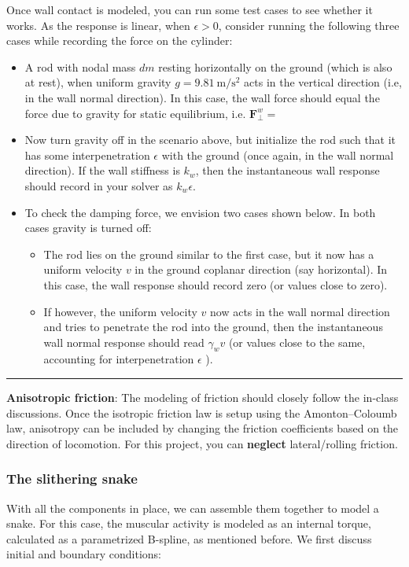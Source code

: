 \documentclass[11pt]{article}
\begin{document}
Once wall contact is modeled, you can run some test cases to see
whether it works. As the response is linear, when \(\epsilon > 0\),
consider running the following three cases while recording the force on the
cylinder:
\begin{itemize}
\item A rod with nodal mass \(dm\) resting horizontally on the ground (which
is also at rest), when
uniform gravity \(g = \SI{9.81}{\m\per\s^2}\) acts in the vertical
direction (i.e, in the wall normal direction). In
this case, the wall force should equal the force due to gravity for static
equilibrium, i.e. \(\mathbf{F}^w_{\perp}=\)
\item Now turn gravity off in the scenario above, but initialize the rod such
that it has some interpenetration \(\epsilon\) with the ground (once
again, in the wall normal direction). If the
wall stiffness is \(k_w\), then the instantaneous wall response should
record in your solver as \(k_w \epsilon\).
\item To check the damping force, we envision two cases shown below. In both
cases gravity is turned off:
\begin{itemize}
\item The rod lies on the ground similar to the first case, but it now has a
uniform velocity \(v\) in the ground coplanar direction (say
horizontal). In this case, the wall response should record zero (or
values close to zero).
\item If however, the uniform velocity \(v\) now acts in the wall normal
direction and tries to penetrate the rod into the ground, then the
instantaneous wall normal response should read \(\gamma_w v\) (or
values close to the same, accounting for interpenetration \(\epsilon\) ).
\end{itemize}
\end{itemize}

\noindent\rule{1\textwidth}{0.01pt}
\textbf{Anisotropic friction}: The modeling of friction should closely follow
the in-class discussions. Once the isotropic friction law is setup using
the Amonton--Coloumb law, anisotropy can be included by changing the
friction coefficients based on the direction of locomotion.
For this project, you can \textbf{neglect} lateral/rolling friction.

\subsubsection{The slithering snake}
\label{sec:orgcd2b203}
With all the components in place, we can assemble them together to model a
snake. For this case, the muscular activity
is modeled as an internal torque, calculated as a parametrized B-spline, as mentioned
before. We first discuss initial and boundary conditions:
\end{document}
